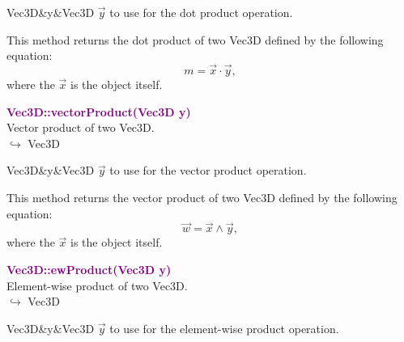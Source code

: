 \begin{tcolorbox}[width=\textwidth,myArgs,tabularx={ll|R}]
Vec3D&y&Vec3D $\overrightarrow{y}$ to use for the dot product operation.
\end{tcolorbox}

This method returns the dot product of two Vec3D defined by the following equation:
\begin{equation*}
m = \overrightarrow{x}\cdot\overrightarrow{y},
\end{equation*}
where the $\overrightarrow{x}$ is the object itself.

\textcolor{purple}{\textbf{Vec3D::vectorProduct(Vec3D y)}}\label{Vec3D::vectorProduct(Vec3D y)}\\
Vector product of two Vec3D.\\ \hspace*{10mm}$\hookrightarrow$ Vec3D

\begin{tcolorbox}[width=\textwidth,myArgs,tabularx={ll|R}]
Vec3D&y&Vec3D $\overrightarrow{y}$ to use for the vector product operation.
\end{tcolorbox}

This method returns the vector product of two Vec3D defined by the following equation:
\begin{equation*}
\overrightarrow{w} = \overrightarrow{x}\land\overrightarrow{y},
\end{equation*}
where the $\overrightarrow{x}$ is the object itself.

\textcolor{purple}{\textbf{Vec3D::ewProduct(Vec3D y)}}\label{Vec3D::ewProduct(Vec3D y)}\\
Element-wise product of two Vec3D.\\ \hspace*{10mm}$\hookrightarrow$ Vec3D

\begin{tcolorbox}[width=\textwidth,myArgs,tabularx={ll|R}]
Vec3D&y&Vec3D $\overrightarrow{y}$ to use for the element-wise product operation.
\end{tcolorbox}

